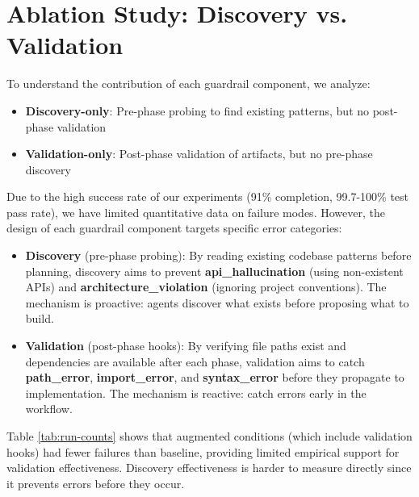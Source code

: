 \documentclass[sigconf,anonymous,review]{acmart}
\begin{document}
\section{Ablation Study: Discovery vs. Validation}

To understand the contribution of each guardrail component, we analyze:
\begin{itemize}
  \item \textbf{Discovery-only}: Pre-phase probing to find existing patterns, but no post-phase validation
  \item \textbf{Validation-only}: Post-phase validation of artifacts, but no pre-phase discovery
\end{itemize}

Due to the high success rate of our experiments (91\% completion, 99.7-100\% test pass rate), we have limited quantitative data on failure modes. However, the design of each guardrail component targets specific error categories:

\begin{itemize}
  \item \textbf{Discovery} (pre-phase probing): By reading existing codebase patterns before planning, discovery aims to prevent \textbf{api\_hallucination} (using non-existent APIs) and \textbf{architecture\_violation} (ignoring project conventions). The mechanism is proactive: agents discover what exists before proposing what to build.
  \item \textbf{Validation} (post-phase hooks): By verifying file paths exist and dependencies are available after each phase, validation aims to catch \textbf{path\_error}, \textbf{import\_error}, and \textbf{syntax\_error} before they propagate to implementation. The mechanism is reactive: catch errors early in the workflow.
\end{itemize}

Table \ref{tab:run-counts} shows that augmented conditions (which include validation hooks) had fewer failures than baseline, providing limited empirical support for validation effectiveness. Discovery effectiveness is harder to measure directly since it prevents errors before they occur.
\end{document}
